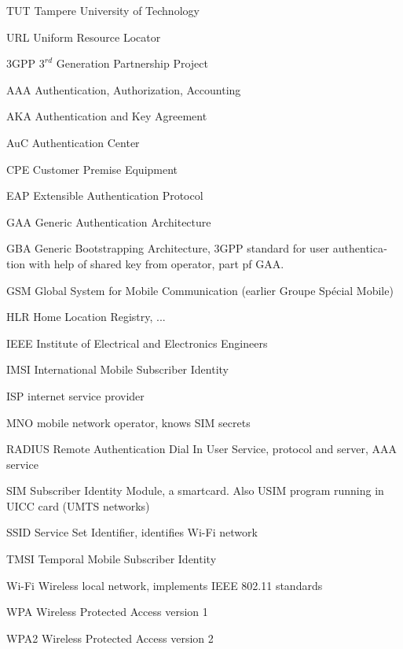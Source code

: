 \documentclass[12pt,a4paper,english]{tutthesis}
\begin{document}
\begin{otherlanguage}{english}
\begin{termlist}
\item [TUT]    Tampere University of Technology
\item [URL]    Uniform Resource Locator
\item[3GPP] $3^{rd}$ Generation Partnership Project
\item[AAA] Authentication, Authorization, Accounting
\item[AKA] Authentication and Key Agreement %
\item[AuC] Authentication Center
\item[CPE] Customer Premise Equipment %
\item[EAP] Extensible Authentication Protocol %
\item[GAA] Generic Authentication Architecture %
\item[GBA] Generic Bootstrapping Architecture, 3GPP standard for user authentication with help of shared key from operator, part pf GAA.
\item[GSM] Global System for Mobile Communication (earlier Groupe Spécial Mobile)
\item[HLR] Home Location Registry, ...
\item[IEEE] Institute of Electrical and Electronics Engineers
\item[IMSI] International Mobile Subscriber Identity
\item[ISP] internet service provider
\item[MNO] mobile network operator, knows SIM secrets
\item[RADIUS] Remote Authentication Dial In User Service, protocol and server,  AAA service 
\item[SIM]  Subscriber Identity Module, a smartcard. Also USIM program running in UICC card (UMTS networks)
\item[SSID] Service Set Identifier, identifies Wi-Fi network
\item[TMSI] Temporal Mobile Subscriber Identity
\item[Wi-Fi] Wireless local network, implements IEEE 802.11 standards
\item[WPA] Wireless Protected Access version 1
\item[WPA2] Wireless Protected Access version 2
\end{termlist} 



\end{otherlanguage}
\end{document}
